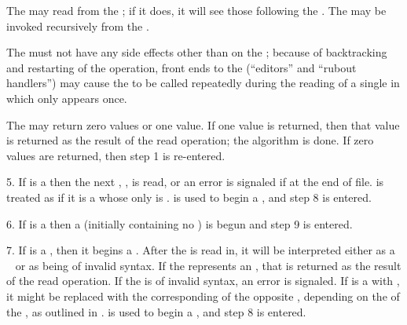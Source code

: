 The  may read  
from the  ; 
if it does, it will see those  following the .
The  may be invoked recursively from the .

The  must not have any side effects other than on the
 ;
because of backtracking and restarting of the  operation,
front ends to the  (\eg ``editors'' and ``rubout handlers'') 
may cause the  to be called repeatedly during the
reading of a single  in which  only appears once.

The  may return zero values or one value.
If one value is returned,
then that value is returned as the result of the read operation;
the algorithm is done.
If zero values are returned, then step 1 is re-entered.

\item{5.}
If  is a  
then the next , , is read, or an error  
is signaled if at the end of file.
 is treated as if it is a  
whose only  is .
 is used to begin a , and step 8 is entered.

\item{6.}
If  is a  
then a  (initially
containing no ) is  begun and step 9 is entered.

\item{7.}
If  is a  , then it begins a .
After the  is read in, it will be interpreted
either as a \Lisp\  or as being of invalid syntax.
If the  represents an ,
that  is returned as the result of the read operation.
If the  is of invalid syntax, an error is signaled.
If  is a  with ,
it might be replaced with the corresponding  of the opposite , 
depending on the  of the ,
as outlined in \secref\ReadtableCaseReadEffect.
 is used to begin a , and step 8 is entered.

